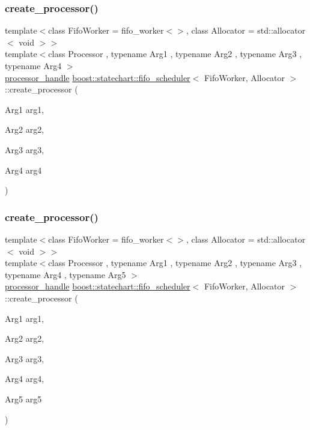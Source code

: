 \subsubsection{\texorpdfstring{create\+\_\+processor()}{create\_processor()}\hspace{0.1cm}{\footnotesize\ttfamily [5/7]}}
{\footnotesize\ttfamily template$<$class Fifo\+Worker = fifo\+\_\+worker$<$$>$, class Allocator = std\+::allocator$<$ void $>$$>$ \\
template$<$class Processor , typename Arg1 , typename Arg2 , typename Arg3 , typename Arg4 $>$ \\
\mbox{\hyperlink{classboost_1_1statechart_1_1fifo__scheduler_ada526939c16c4f8118bc4d7bbf09ad7d}{processor\+\_\+handle}} \mbox{\hyperlink{classboost_1_1statechart_1_1fifo__scheduler}{boost\+::statechart\+::fifo\+\_\+scheduler}}$<$ Fifo\+Worker, Allocator $>$\+::create\+\_\+processor (\begin{DoxyParamCaption}\item[{Arg1}]{arg1,  }\item[{Arg2}]{arg2,  }\item[{Arg3}]{arg3,  }\item[{Arg4}]{arg4 }\end{DoxyParamCaption})\hspace{0.3cm}{\ttfamily [inline]}}

\mbox{\label{classboost_1_1statechart_1_1fifo__scheduler_aa4ccee39767ff4c0e883bcde7a637987}} 
\subsubsection{\texorpdfstring{create\+\_\+processor()}{create\_processor()}\hspace{0.1cm}{\footnotesize\ttfamily [6/7]}}
{\footnotesize\ttfamily template$<$class Fifo\+Worker = fifo\+\_\+worker$<$$>$, class Allocator = std\+::allocator$<$ void $>$$>$ \\
template$<$class Processor , typename Arg1 , typename Arg2 , typename Arg3 , typename Arg4 , typename Arg5 $>$ \\
\mbox{\hyperlink{classboost_1_1statechart_1_1fifo__scheduler_ada526939c16c4f8118bc4d7bbf09ad7d}{processor\+\_\+handle}} \mbox{\hyperlink{classboost_1_1statechart_1_1fifo__scheduler}{boost\+::statechart\+::fifo\+\_\+scheduler}}$<$ Fifo\+Worker, Allocator $>$\+::create\+\_\+processor (\begin{DoxyParamCaption}\item[{Arg1}]{arg1,  }\item[{Arg2}]{arg2,  }\item[{Arg3}]{arg3,  }\item[{Arg4}]{arg4,  }\item[{Arg5}]{arg5 }\end{DoxyParamCaption})\hspace{0.3cm}{\ttfamily [inline]}}

